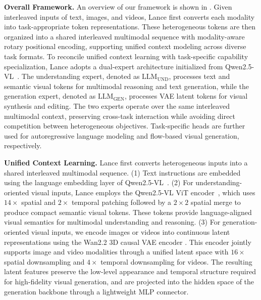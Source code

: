 \documentclass{llmxive}
\begin{document}
\textbf{Overall Framework.}
An overview of our framework is shown in . 
Given interleaved inputs of text, images, and videos, Lance first converts each modality into task-appropriate token representations. These heterogeneous tokens are then organized into a shared interleaved multimodal sequence with modality-aware rotary positional encoding, supporting unified context modeling across diverse task formats.
To reconcile unified context learning with task-specific capability specialization, Lance adopts a dual-expert architecture initialized from Qwen2.5-VL~\cite{Qwen2.5-VL}. The understanding expert, denoted as $\mathrm{LLM}_{\mathrm{UND}}$, processes text and semantic visual tokens for multimodal reasoning and text generation, while the generation expert, denoted as $\mathrm{LLM}_{\mathrm{GEN}}$, processes VAE latent tokens for visual synthesis and editing. The two experts operate over the same interleaved multimodal context, preserving cross-task interaction while avoiding direct competition between heterogeneous objectives. 
Task-specific heads are further used for autoregressive language modeling and flow-based visual generation, respectively.


\textbf{Unified Context Learning.}
Lance first converts heterogeneous inputs into a shared interleaved multimodal sequence. (1) Text instructions are embedded using the language embedding layer of Qwen2.5-VL~\cite{Qwen2.5-VL}. (2) For understanding-oriented visual inputs, Lance employs the Qwen2.5-VL ViT encoder~\cite{Qwen2.5-VL}, which uses $14\times$ spatial and $2\times$ temporal patching followed by a $2\times2$ spatial merge to produce compact semantic visual tokens. These tokens provide language-aligned visual semantics for multimodal understanding and reasoning. (3) For generation-oriented visual inputs, we encode images or videos into continuous latent representations using the Wan2.2 3D causal VAE encoder \cite{wan2025wan}. This encoder jointly supports image and video modalities through a unified latent space with $16\times$ spatial downsampling and $4\times$ temporal downsampling for videos.
 The resulting latent features preserve the low-level appearance and temporal structure required for high-fidelity visual generation, and are projected into the hidden space of the generation backbone through a lightweight MLP connector.
\end{document}
